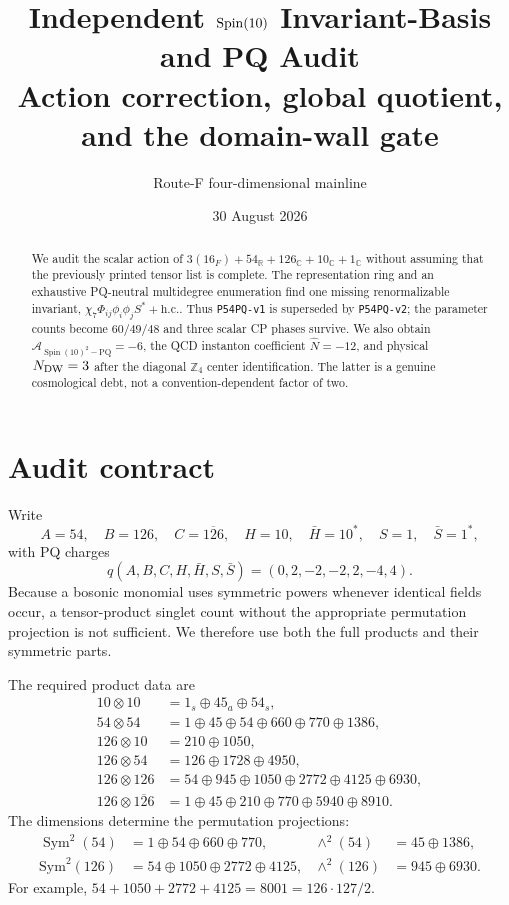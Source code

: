 \documentclass[11pt]{article}
\title{Independent $\Spin(10)$ Invariant-Basis and PQ Audit\\
\large Action correction, global quotient, and the domain-wall gate}
\author{Route-F four-dimensional mainline}
\date{30 August 2026}
\newcommand{\Spin}{\operatorname{Spin}}
\newcommand{\Sym}{\operatorname{Sym}}
\newcommand{\hc}{\mathrm{h.c.}}
\newcommand{\A}{\mathcal A}
\begin{document}
\maketitle

\begin{abstract}
We audit the scalar action of
$3(16_F)+54_{\mathbb R}+126_{\mathbb C}+10_{\mathbb C}+1_{\mathbb C}$
without assuming that the previously printed tensor list is complete.  The
representation ring and an exhaustive PQ-neutral multidegree enumeration
find one missing renormalizable invariant,
$\chi_7\Phi_{ij}\phi_i\phi_jS^*+\hc$.  Thus \texttt{P54PQ-v1} is superseded
by \texttt{P54PQ-v2}; the parameter counts become $60/49/48$ and three
scalar CP phases survive.  We also obtain
$\A_{\Spin(10)^2-\mathrm{PQ}}=-6$, the QCD instanton coefficient
$\widehat N=-12$, and physical $N_{\rm DW}=3$ after the diagonal
$\mathbb Z_4$ center identification.  The latter is a genuine cosmological
debt, not a convention-dependent factor of two.
\end{abstract}

\section{Audit contract}

Write
\begin{equation}
 A=54,\quad B=126,\quad C=\overline{126},\quad
 H=10,\quad \bar H=10^*,\quad S=1,\quad \bar S=1^*,
\end{equation}
with PQ charges
\begin{equation}
 q(A,B,C,H,\bar H,S,\bar S)=(0,2,-2,-2,2,-4,4).
 \label{eq:charges}
\end{equation}
Because a bosonic monomial uses symmetric powers whenever identical fields
occur, a tensor-product singlet count without the appropriate permutation
projection is not sufficient.  We therefore use both the full products and
their symmetric parts.

The required product data are \cite{Slansky1981}
\begin{align}
10\otimes10&=1_s\oplus45_a\oplus54_s,\label{eq:10sq}\\
54\otimes54&=1\oplus45\oplus54\oplus660\oplus770\oplus1386,\nonumber\\
126\otimes10&=210\oplus1050,\nonumber\\
126\otimes54&=126\oplus1728\oplus4950,\nonumber\\
126\otimes126&=54\oplus945\oplus1050\oplus2772\oplus4125\oplus6930,
\nonumber\\
126\otimes\overline{126}
 &=1\oplus45\oplus210\oplus770\oplus5940\oplus8910.
 \label{eq:products}
\end{align}
The dimensions determine the permutation projections:
\begin{align}
\Sym^2(54)&=1\oplus54\oplus660\oplus770,
&\wedge^2(54)&=45\oplus1386,\nonumber\\
\mathrm{Sym}^2(126)&=54\oplus1050\oplus2772\oplus4125,
&\wedge^2(126)&=945\oplus6930.
\label{eq:symmetric-products}
\end{align}
For example, $54+1050+2772+4125=8001=126\cdot127/2$.
\end{document}
